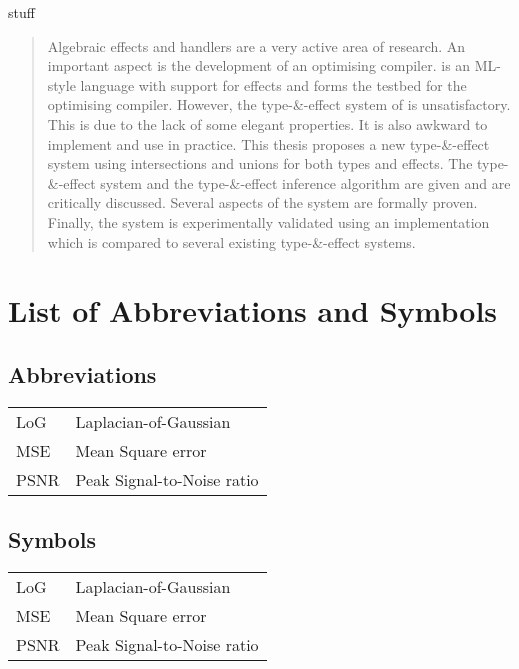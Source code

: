 \documentclass[master=cws,masteroption=ai, english]{kulemt}
\begin{document}
\begin{preface}
  stuff
\end{preface}

\tableofcontents*

\begin{abstract}
  Algebraic effects and handlers are a very active area of research. An
  important aspect is the development of an optimising compiler. \eff is
  an ML-style language with support for effects and forms the testbed for
  the optimising compiler. However, the type-\&-effect system of \eff is
  unsatisfactory. This is due to the lack of some elegant properties. It
  is also awkward to implement and use in practice. This thesis proposes a
  new type-\&-effect system using intersections and unions for both types
  and effects. The type-\&-effect system and the type-\&-effect inference
  algorithm are given and are critically discussed. Several aspects of the
  system are formally proven. Finally, the system is experimentally
  validated using an implementation which is compared to several existing
  type-\&-effect systems.
\end{abstract}

\listoffigures
\listoftables

\chapter{List of Abbreviations and Symbols}\section*{Abbreviations}\begin{flushleft}
  \renewcommand{\arraystretch}{1.1}
  \begin{tabularx}{\textwidth}{@{}p{12mm}X@{}}
    LoG   & Laplacian-of-Gaussian \\
    MSE   & Mean Square error \\
    PSNR  & Peak Signal-to-Noise ratio \\
  \end{tabularx}
\end{flushleft}\section*{Symbols}\begin{flushleft}
  \renewcommand{\arraystretch}{1.1}
  \begin{tabularx}{\textwidth}{@{}p{12mm}X@{}}
    LoG   & Laplacian-of-Gaussian \\
    MSE   & Mean Square error \\
    PSNR  & Peak Signal-to-Noise ratio \\
  \end{tabularx}
\end{flushleft}
\end{document}
